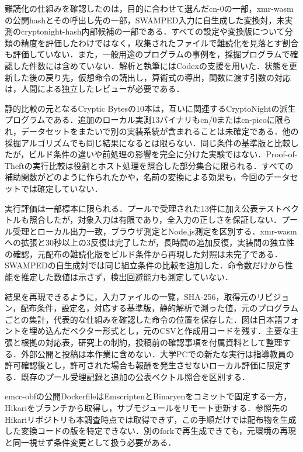 \documentclass[submit,techrep]{ipsj}
\begin{document}
難読化の仕組みを確認したのは，目的に合わせて選んだcn-0の一部，xmr-wasmの公開hashとその呼出し先の一部，SWAMPED入力に自生成した変換対，未実測のcryptonight-hash内部候補の一部である．すべての設定や変換版について分類の精度を評価したわけではなく，収集されたファイルで難読化を見落とす割合も評価していない．また，一般用途のプログラムの事例を，採掘プログラムで確認した件数には含めていない．解析と執筆にはCodexの支援を用いた．状態を更新した後の戻り先，仮想命令の読出し，算術式の導出，関数に渡す引数の対応は，人間による独立したレビューが必要である．

静的比較の元となるCryptic Bytesの10本は，互いに関連するCryptoNightの派生プログラムである．追加のローカル実測13バイナリもcn/0またはcn-picoに限られ，データセットをまたいで別の実装系統が含まれることは未確定である．他の採掘アルゴリズムでも同じ結果になるとは限らない．同じ条件の基準版と比較したが，ビルド条件の違いや前処理の影響を完全に分けた実験ではない．Proof-of-Theftの実行比較は役割とホスト処理を照合した部分集合に限られる．すべての補助関数がどのように作られたかや，名前の変換による効果も，今回のデータセットでは確定していない．

実行評価は一部標本に限られる．プールで受理された13件に加え公表テストベクトルも照合したが，対象入力は有限であり，全入力の正しさを保証しない．プール受理とローカル出力一致，ブラウザ測定とNode.js測定を区別する．xmr-wasmへの拡張と30秒以上の3反復は完了したが，長時間の追加反復，実装間の独立性の確認，元配布の難読化版をビルド条件から再現した対照は未完了である．SWAMPEDの自生成対では同じ組立条件の比較を追加した．命令数だけから性能を推定した数値は示さず，検出回避能力も測定していない．

結果を再現できるように，入力ファイルの一覧，SHA-256，取得元のリビジョン，配布条件，設定名，対応する基準版，静的解析で測った値，元のプログラムごとの集計，代表的な仕組みを確認した命令の位置を保存した．図は日本語フォントを埋め込んだベクター形式とし，元のCSVと作成用コードを残す．主要な主張と根拠の対応表，研究上の制約，投稿前の確認事項を付属資料として整理する．外部公開と投稿は本作業に含めない．大学PCでの新たな実行は指導教員の許可確認後とし，許可された場合も報酬を発生させないローカル評価に限定する．既存のプール受理記録と追加の公表ベクトル照合を区別する．

emcc-obfの公開DockerfileはEmscriptenとBinaryenをコミットで固定する一方，Hikariをブランチから取得し，サブモジュールをリモート更新する\cite{emccobfdocs}．参照先のHikariリポジトリも本調査時点では取得できず，この手順だけでは配布物を生成した変換コードの版を特定できない．別のforkで再生成できても，元環境の再現と同一視せず条件変更として扱う必要がある．
\end{document}
